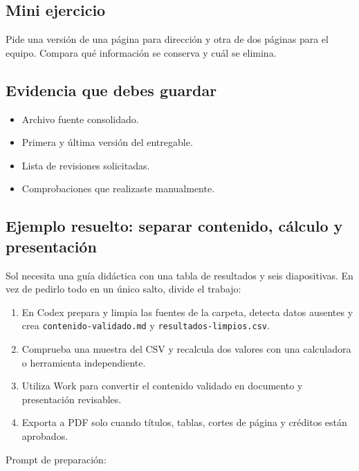 \documentclass[10pt,a4paper,openany]{book}
\providecommand{\tightlist}{\setlength{\itemsep}{0.18em}\setlength{\parskip}{0pt}}
\begin{document}
\subsection{Mini ejercicio}\label{mini-ejercicio-4}

Pide una versión de una página para dirección y otra de dos páginas para
el equipo. Compara qué información se conserva y cuál se elimina.

\subsection{Evidencia que debes
guardar}\label{evidencia-que-debes-guardar-7}

\begin{itemize}
\tightlist
\item
  Archivo fuente consolidado.
\item
  Primera y última versión del entregable.
\item
  Lista de revisiones solicitadas.
\item
  Comprobaciones que realizaste manualmente.
\end{itemize}

\subsection{Ejemplo resuelto: separar contenido, cálculo y
presentación}\label{ejemplo-resuelto-separar-contenido-cuxe1lculo-y-presentaciuxf3n}

Sol necesita una guía didáctica con una tabla de resultados y seis
diapositivas. En vez de pedirlo todo en un único salto, divide el
trabajo:

\begin{enumerate}
\def\labelenumi{\arabic{enumi}.}
\tightlist
\item
  En Codex prepara y limpia las fuentes de la carpeta, detecta datos
  ausentes y crea \texttt{contenido-validado.md} y
  \texttt{resultados-limpios.csv}.
\item
  Comprueba una muestra del CSV y recalcula dos valores con una
  calculadora o herramienta independiente.
\item
  Utiliza Work para convertir el contenido validado en documento y
  presentación revisables.
\item
  Exporta a PDF solo cuando títulos, tablas, cortes de página y créditos
  están aprobados.
\end{enumerate}

Prompt de preparación:
\end{document}
